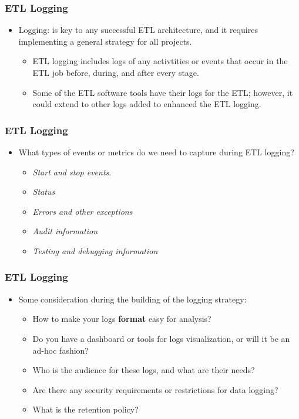 \begin{frame}
	\frametitle{ETL Logging}
	\begin{itemize}
		\item Logging: is key to any successful ETL architecture, and it requires implementing a general strategy for all projects.

		\begin{itemize}
			\item ETL logging includes logs of any activtities or events that occur in the ETL job before, during, and after every stage.
			\item Some of the ETL software tools have their logs for the ETL; however, it could extend to other logs added to enhanced the ETL logging.
		\end{itemize}
	\end{itemize}
\end{frame}


\begin{frame}
	\frametitle{ETL Logging}
	\begin{itemize}

		\item What types of events or metrics do we need to capture during ETL logging?
		\begin{itemize}

			\item \textit{Start and stop events}.
			\item \textit{Status}
			\item \textit{Errors and other exceptions}
			\item \textit{Audit information}
			\item \textit{Testing and debugging information}
		\end{itemize}
	\end{itemize}
\end{frame}


\begin{frame}
	\frametitle{ETL Logging}
	\begin{itemize}

		\item Some consideration during the building of the logging strategy:
		\begin{itemize}
			\item How to make your logs \textbf{format} easy for analysis?
			\item Do you have a dashboard or tools for logs visualization, or will it be an ad-hoc fashion?
			\item Who is the audience for these logs, and what are their needs?
			\item Are there any security requirements or restrictions for data logging?
			\item What is the retention policy?
		\end{itemize}
	\end{itemize}
\end{frame}


